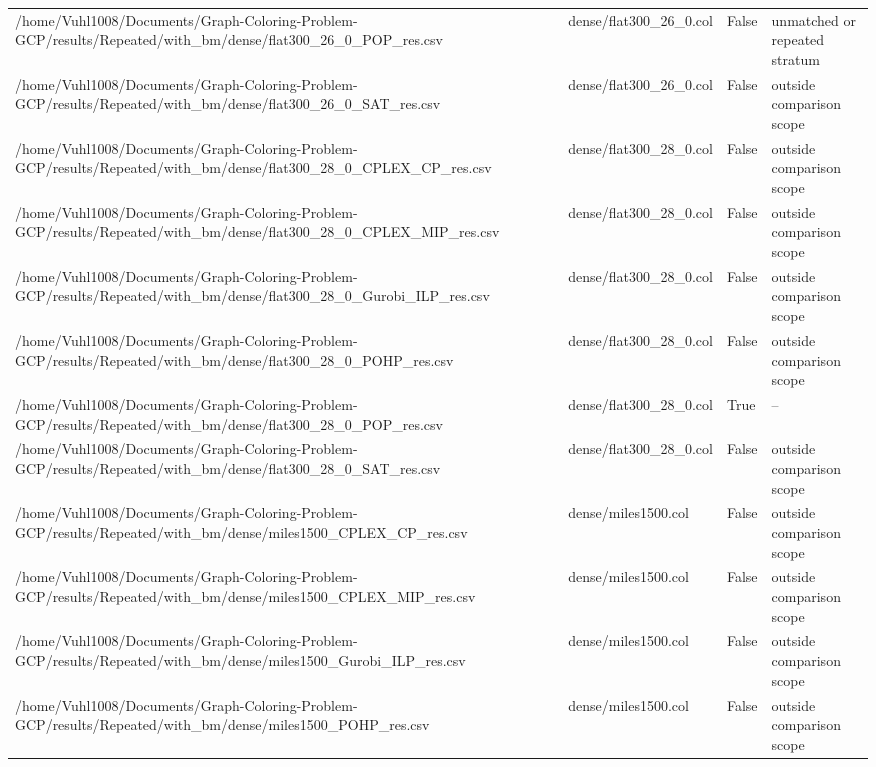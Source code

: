 \begin{table}[htbp]
\begin{tabular}{llll}
/home/Vuhl1008/Documents/Graph-Coloring-Problem-GCP/results/Repeated/with\_bm/dense/flat300\_26\_0\_POP\_res.csv & dense/flat300\_26\_0.col & False & unmatched or repeated stratum \\
/home/Vuhl1008/Documents/Graph-Coloring-Problem-GCP/results/Repeated/with\_bm/dense/flat300\_26\_0\_SAT\_res.csv & dense/flat300\_26\_0.col & False & outside comparison scope \\
/home/Vuhl1008/Documents/Graph-Coloring-Problem-GCP/results/Repeated/with\_bm/dense/flat300\_28\_0\_CPLEX\_CP\_res.csv & dense/flat300\_28\_0.col & False & outside comparison scope \\
/home/Vuhl1008/Documents/Graph-Coloring-Problem-GCP/results/Repeated/with\_bm/dense/flat300\_28\_0\_CPLEX\_MIP\_res.csv & dense/flat300\_28\_0.col & False & outside comparison scope \\
/home/Vuhl1008/Documents/Graph-Coloring-Problem-GCP/results/Repeated/with\_bm/dense/flat300\_28\_0\_Gurobi\_ILP\_res.csv & dense/flat300\_28\_0.col & False & outside comparison scope \\
/home/Vuhl1008/Documents/Graph-Coloring-Problem-GCP/results/Repeated/with\_bm/dense/flat300\_28\_0\_POHP\_res.csv & dense/flat300\_28\_0.col & False & outside comparison scope \\
/home/Vuhl1008/Documents/Graph-Coloring-Problem-GCP/results/Repeated/with\_bm/dense/flat300\_28\_0\_POP\_res.csv & dense/flat300\_28\_0.col & True & -- \\
/home/Vuhl1008/Documents/Graph-Coloring-Problem-GCP/results/Repeated/with\_bm/dense/flat300\_28\_0\_SAT\_res.csv & dense/flat300\_28\_0.col & False & outside comparison scope \\
/home/Vuhl1008/Documents/Graph-Coloring-Problem-GCP/results/Repeated/with\_bm/dense/miles1500\_CPLEX\_CP\_res.csv & dense/miles1500.col & False & outside comparison scope \\
/home/Vuhl1008/Documents/Graph-Coloring-Problem-GCP/results/Repeated/with\_bm/dense/miles1500\_CPLEX\_MIP\_res.csv & dense/miles1500.col & False & outside comparison scope \\
/home/Vuhl1008/Documents/Graph-Coloring-Problem-GCP/results/Repeated/with\_bm/dense/miles1500\_Gurobi\_ILP\_res.csv & dense/miles1500.col & False & outside comparison scope \\
/home/Vuhl1008/Documents/Graph-Coloring-Problem-GCP/results/Repeated/with\_bm/dense/miles1500\_POHP\_res.csv & dense/miles1500.col & False & outside comparison scope \\

\end{tabular}
\end{table}

